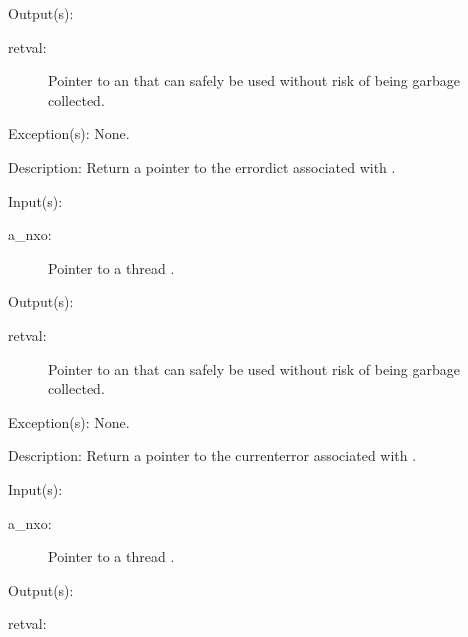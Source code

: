 \begin{capi}
\begin{capilist}
	\item[Output(s): ]
		\begin{description}\item[]
		\item[retval: ]
			Pointer to an  that can safely be used
			without risk of being garbage collected.
		\end{description}
	\item[Exception(s): ] None.
	\item[Description: ]
		Return a pointer to the errordict associated with .
	\end{capilist}
\label{nxo_thread_currenterror_get}
	\begin{capilist}
	\item[Input(s): ]
		\begin{description}\item[]
		\item[a\_nxo: ]
			Pointer to a thread .
		\end{description}
	\item[Output(s): ]
		\begin{description}\item[]
		\item[retval: ]
			Pointer to an  that can safely be used
			without risk of being garbage collected.
		\end{description}
	\item[Exception(s): ] None.
	\item[Description: ]
		Return a pointer to the currenterror associated with
		.
	\end{capilist}
\label{nxo_thread_ostack_get}
	\begin{capilist}
	\item[Input(s): ]
		\begin{description}\item[]
		\item[a\_nxo: ]
			Pointer to a thread \classname{nxo}.
		\end{description}
	\item[Output(s): ]
		\begin{description}\item[]
		\item[retval: ]

\end{description}
\end{capilist}
\end{capi}
